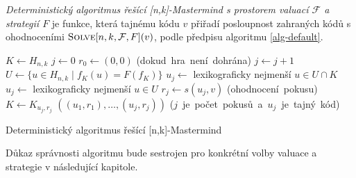 \begin{definice}\label{defobecnyalg}
    \emph{Deterministický algoritmus řešící [n,k]-Mastermind s prostorem valuací $\mathcal{F}$ a strategií $F$} je funkce, která tajnému kódu $v$ přiřadí posloupnost zahraných kódů s ohodnoceními $\textsc{Solve}[n, k, \mathcal{F}, F](v)$, podle předpisu algoritmu \ref{alg-default}.
    
    
    
\end{definice}
\begin{algorithm}[h!]
\begin{algorithmic}[1]  %
    \State $K \gets H_{n,k}$ 
    \State $j \gets 0$
    \State $r_0 \gets (0,0)$
     \hfill \mbox{(dokud hra není dohrána)}
        \State $j \gets j + 1$ 
	\State $U \gets \{u \in H_{n,k} \mid f_K(u) = F(f_K)\}$
            \State $u_j \gets$ lexikograficky nejmenší $u \in U \cap K$
	\Else
		\State $u_j \gets$ lexikograficky nejmenší $u \in U$
	\EndIf
        \State $r_j \gets s(u_j, v)$ \hfill \mbox{(ohodnocení pokusu)}
        \State $K \gets K_{u_j,r_j}$
    \EndWhile
    \State \Return $((u_1,r_1),\dots,(u_j, r_j))$ \hfill \mbox{($j$ je počet pokusů a $u_j$ je tajný kód)}
\EndFunction
\end{algorithmic}
\caption{Deterministický algoritmus řešící [n,k]-Mastermind}
\label{alg-default}
\end{algorithm}

\begin{pozn}
    Důkaz správnosti algoritmu bude sestrojen pro konkrétní volby valuace a strategie v následující kapitole. 
\end{pozn}


